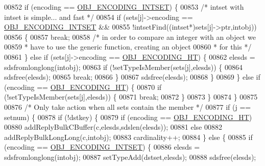 \begin{DoxyCode}
00852             \textcolor{keywordflow}{if} (encoding == \hyperlink{server_8h_a214173987de21c3b7661fddd42b05873}{OBJ\_ENCODING\_INTSET}) \{
00853                 \textcolor{comment}{/* intset with intset is simple... and fast */}
00854                 \textcolor{keywordflow}{if} (sets[j]->encoding == \hyperlink{server_8h_a214173987de21c3b7661fddd42b05873}{OBJ\_ENCODING\_INTSET} &&
00855                     !intsetFind((intset*)sets[j]->ptr,intobj))
00856                 \{
00857                     \textcolor{keywordflow}{break};
00858                 \textcolor{comment}{/* in order to compare an integer with an object we}
00859 \textcolor{comment}{                 * have to use the generic function, creating an object}
00860 \textcolor{comment}{                 * for this */}
00861                 \} \textcolor{keywordflow}{else} \textcolor{keywordflow}{if} (sets[j]->encoding == \hyperlink{server_8h_a9c10219f68afc557d510d108257d238b}{OBJ\_ENCODING\_HT}) \{
00862                     elesds = sdsfromlonglong(intobj);
00863                     \textcolor{keywordflow}{if} (!setTypeIsMember(sets[j],elesds)) \{
00864                         sdsfree(elesds);
00865                         \textcolor{keywordflow}{break};
00866                     \}
00867                     sdsfree(elesds);
00868                 \}
00869             \} \textcolor{keywordflow}{else} \textcolor{keywordflow}{if} (encoding == \hyperlink{server_8h_a9c10219f68afc557d510d108257d238b}{OBJ\_ENCODING\_HT}) \{
00870                 \textcolor{keywordflow}{if} (!setTypeIsMember(sets[j],elesds)) \{
00871                     \textcolor{keywordflow}{break};
00872                 \}
00873             \}
00874         \}
00875 
00876         \textcolor{comment}{/* Only take action when all sets contain the member */}
00877         \textcolor{keywordflow}{if} (j == setnum) \{
00878             \textcolor{keywordflow}{if} (!dstkey) \{
00879                 \textcolor{keywordflow}{if} (encoding == \hyperlink{server_8h_a9c10219f68afc557d510d108257d238b}{OBJ\_ENCODING\_HT})
00880                     addReplyBulkCBuffer(c,elesds,sdslen(elesds));
00881                 \textcolor{keywordflow}{else}
00882                     addReplyBulkLongLong(c,intobj);
00883                 cardinality++;
00884             \} \textcolor{keywordflow}{else} \{
00885                 \textcolor{keywordflow}{if} (encoding == \hyperlink{server_8h_a214173987de21c3b7661fddd42b05873}{OBJ\_ENCODING\_INTSET}) \{
00886                     elesds = sdsfromlonglong(intobj);
00887                     setTypeAdd(dstset,elesds);
00888                     sdsfree(elesds);

\end{DoxyCode}
